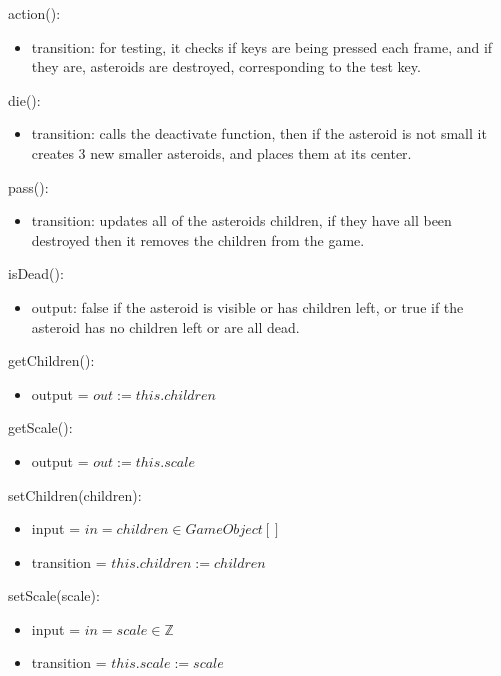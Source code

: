 \documentclass[12pt]{article}
\begin{document}
\noindent action():
\begin{itemize}
    \item transition: for testing, it checks if keys are being pressed each frame, and if they are, asteroids are destroyed, corresponding to the test key.
\end{itemize}

\noindent die():
\begin{itemize}
    \item transition: calls the deactivate function, then if the asteroid is not small it creates 3 new smaller asteroids, and places them at its center.
\end{itemize}

\noindent pass():
\begin{itemize}
    \item transition: updates all of the asteroids children, if they have all been destroyed then it removes the children from the game.
\end{itemize}

\noindent isDead():
\begin{itemize}
    \item output: false if the asteroid is visible or has children left, or true if the asteroid has no children left or are all dead.
\end{itemize}

\noindent getChildren():
\begin{itemize}
    \item output = $out := this.children$
\end{itemize}

\noindent getScale():
\begin{itemize}
    \item output = $out := this.scale$
\end{itemize}

\noindent setChildren(children):
\begin{itemize}
    \item input = $in = children \in GameObject[]$
    \item transition = $this.children := children$
\end{itemize}

\noindent setScale(scale):
\begin{itemize}
    \item input = $in = scale \in \mathbb{Z}$
    \item transition = $this.scale := scale$
\end{itemize}
\end{document}
